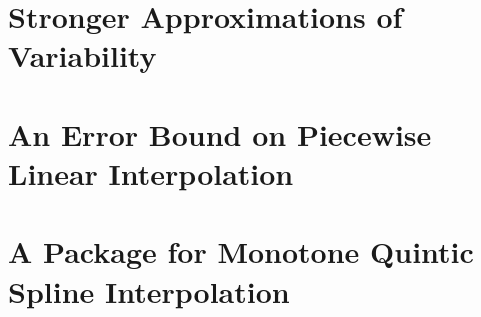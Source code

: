 \documentclass[singlespace,nopageskip]{VTthesis} %
\begin{document}
\chapter{Stronger Approximations of Variability} \label{ch:strong}


\chapter{An Error Bound on Piecewise Linear Interpolation} \label{ch:error}


\chapter{A Package for Monotone Quintic Spline Interpolation} \label{ch:splines}







\appendix
\end{document}
